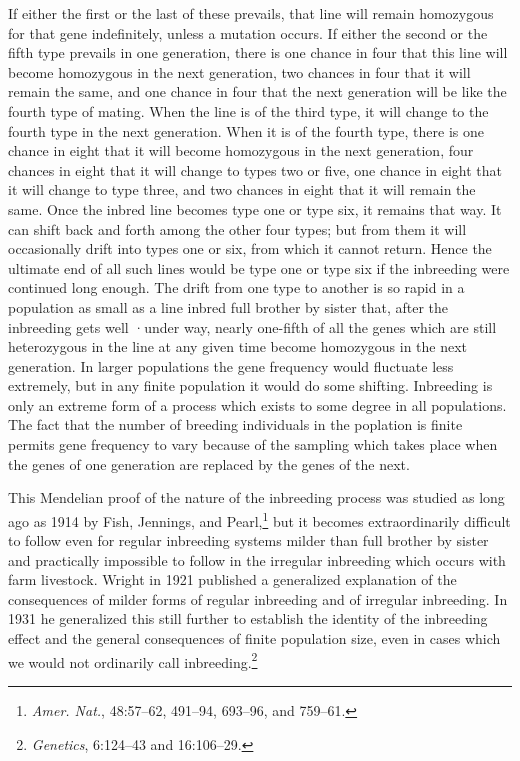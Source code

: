 \noindent
If either the first or the last of these prevails, that line will remain
homozygous for that gene indefinitely, unless a mutation occurs. If
either the second or the fifth type prevails in one generation, there is
one chance in four that this line will become homozygous in the next
generation, two chances in four that it will remain the same, and one
chance in four that the next generation will be like the fourth type of
mating. When the line is of the third type, it will change to the fourth
type in the next generation. When it is of the fourth type, there is one
chance in eight that it will become homozygous in the next generation,
four chances in eight that it will change to types two or five, one chance
in eight that it will change to type three, and two chances in eight that
it will remain the same. Once the inbred line becomes type one or type
six, it remains that way. It can shift back and forth among the other
four types; but from them it will occasionally drift into types one or six,
from which it cannot return. Hence the ultimate end of all such lines
would be type one or type six if the inbreeding were continued long
enough. The drift from one type to another is so rapid in a population
as small as a line inbred full brother by sister that, after the inbreeding
gets well ·under way, nearly one-fifth of all the genes which are still heterozygous
in the line at any given time become homozygous in the next
generation. In larger populations the gene frequency would fluctuate
less extremely, but in any finite population it would do some shifting.
Inbreeding is only an extreme form of a process which exists to some
degree in all populations. The fact that the number of breeding individuals
in the poplation is finite permits gene frequency to vary
because of the sampling which takes place when the genes of one generation
are replaced by the genes of the next.

This Mendelian proof of the nature of the inbreeding process was
studied as long ago as 1914 by Fish, Jennings, and
Pearl,\footnote{\textit{Amer. Nat.}, 48:57--62, 491--94, 693--96, and 759--61.}
but it becomes extraordinarily difficult to follow even for regular
inbreeding systems milder than full brother by sister and practically
impossible to follow in the irregular inbreeding which occurs with farm
livestock. Wright in 1921 published a generalized explanation of the
consequences of milder forms of regular inbreeding and of irregular
inbreeding. In 1931 he generalized this still further to establish the
identity of the inbreeding effect and the general consequences of finite
population size, even in cases which we would not ordinarily call
inbreeding.\footnote{\textit{Genetics}, 6:124--43 and 16:106--29.}
\noclub

